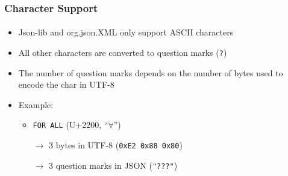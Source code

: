 \documentclass[
    alternativetitlepage=alternativ,
    cornerlogo=hgi_nds_logo2,
    sectionoverview,
]{rubpresentation}
\begin{document}
\begin{frame}
  \frametitle{Character Support}
  \framesubtitle{}
  \begin{itemize}
    \item{} Json-lib and org.json.XML only support ASCII characters
    \item{} All other characters are converted to question marks (\texttt{?})
    \item{} The number of question marks depends on the number of bytes used to encode the char in UTF-8
    \item{} Example:
      \begin{itemize}
          \item{} \texttt{FOR ALL} (U+2200, \enquote{$\forall$})
          \item[$\rightarrow$] 3 bytes in UTF-8 (\texttt{0xE2 0x88 0x80})
          \item[$\rightarrow$] 3 question marks in JSON (\texttt{"???"})
      \end{itemize}
  \end{itemize}
\end{frame}
\end{document}
